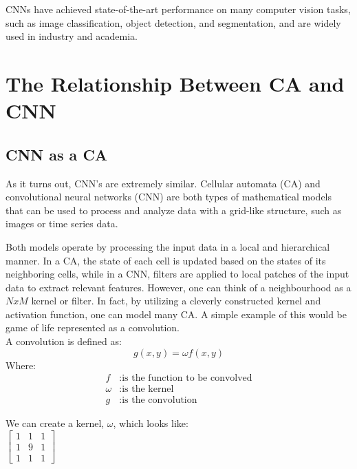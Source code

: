 CNNs have achieved state-of-the-art performance on many computer vision tasks, such as image classification, object detection, and segmentation, and are widely used in industry and academia.

\section{The Relationship Between CA and CNN}
\subsection{CNN as a CA}
As it turns out, CNN's are extremely similar. Cellular automata (CA) and convolutional neural networks (CNN) are both types of mathematical models that can be used to process and analyze data with a grid-like structure, such as images or time series data. \cite{PhysRevE.100.032402}

Both models operate by processing the input data in a local and hierarchical manner. In a CA, the state of each cell is updated based on the states of its neighboring cells, while in a CNN, filters are applied to local patches of the input data to extract relevant features. However, one can think of a neighbourhood as a $NxM$ kernel or filter. In fact, by utilizing a cleverly constructed kernel and activation function, one can model many CA. A simple example of this would be game of life represented as a convolution. \\

A convolution is defined as: \\

\begin{equation*}
	g(x,y) = \omega f(x, y)
\end{equation*}
Where:
\begin{align*}
	f &: \text{is the function to be convolved} \\
	\omega &: \text{is the kernel}  \\
	g &: \text{is the convolution} 
\end{align*} 

We can create a kernel, $\omega$, which looks like: \\

$
\begin{bmatrix}
	1 & 1 & 1 \\
	1 & 9 & 1 \\
	1 & 1 & 1
\end{bmatrix}
$
\\

